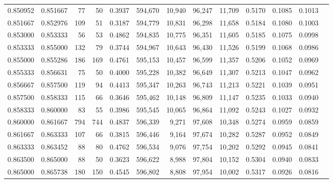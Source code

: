 \begin{tabular}{rrrrrrrrrrrrr}
0.850952 & 0.851667 &    77 &  50 &                                     0.3937 & 594,670 &  10,940 &  96,247 &  11,709 & 0.5170 & 0.1085 & 0.1013 \\
0.851667 & 0.852976 &   109 &  51 &                                     0.3187 & 594,779 &  10,831 &  96,298 &  11,658 & 0.5184 & 0.1080 & 0.1003 \\
0.853000 & 0.853333 &    56 &  53 &                                     0.4862 & 594,835 &  10,775 &  96,351 &  11,605 & 0.5185 & 0.1075 & 0.0998 \\
0.853333 & 0.855000 &   132 &  79 &                                     0.3744 & 594,967 &  10,643 &  96,430 &  11,526 & 0.5199 & 0.1068 & 0.0986 \\
0.855000 & 0.855286 &   186 & 169 &                                     0.4761 & 595,153 &  10,457 &  96,599 &  11,357 & 0.5206 & 0.1052 & 0.0969 \\
0.855333 & 0.856631 &    75 &  50 &                                     0.4000 & 595,228 &  10,382 &  96,649 &  11,307 & 0.5213 & 0.1047 & 0.0962 \\
0.856667 & 0.857500 &   119 &  94 &                                     0.4413 & 595,347 &  10,263 &  96,743 &  11,213 & 0.5221 & 0.1039 & 0.0951 \\
0.857500 & 0.858333 &   115 &  66 &                                     0.3646 & 595,462 &  10,148 &  96,809 &  11,147 & 0.5235 & 0.1033 & 0.0940 \\
0.858333 & 0.860000 &    83 &  55 &                                     0.3986 & 595,545 &  10,065 &  96,864 &  11,092 & 0.5243 & 0.1027 & 0.0932 \\
0.860000 & 0.861667 &   794 & 744 &                                     0.4837 & 596,339 &   9,271 &  97,608 &  10,348 & 0.5274 & 0.0959 & 0.0859 \\
0.861667 & 0.863333 &   107 &  66 &                                     0.3815 & 596,446 &   9,164 &  97,674 &  10,282 & 0.5287 & 0.0952 & 0.0849 \\
0.863333 & 0.863452 &    88 &  80 &                                     0.4762 & 596,534 &   9,076 &  97,754 &  10,202 & 0.5292 & 0.0945 & 0.0841 \\
0.863500 & 0.865000 &    88 &  50 &                                     0.3623 & 596,622 &   8,988 &  97,804 &  10,152 & 0.5304 & 0.0940 & 0.0833 \\
0.865000 & 0.865738 &   180 & 150 &                                     0.4545 & 596,802 &   8,808 &  97,954 &  10,002 & 0.5317 & 0.0926 & 0.0816 \\

\end{tabular}
